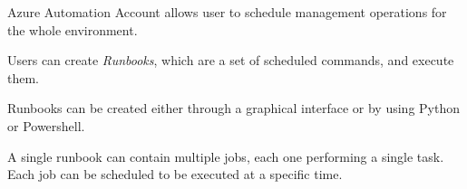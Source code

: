 Azure Automation Account allows user to schedule management operations for the whole environment.

Users can create \textit{Runbooks}, which are a set of scheduled commands, and execute them.

Runbooks can be created either through a graphical interface or by using Python or Powershell.

A single runbook can contain multiple jobs, each one performing a single task.
Each job can be scheduled to be executed at a specific time.

